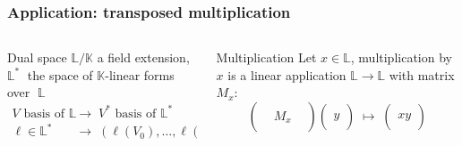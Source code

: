 \documentclass[10pt]{beamer}
\newcommand{\cat}[1]{\mathscr{#1}}
\renewcommand{\L}{\cat{L}}
\newcommand{\K}{\mathbb{K}}
\renewcommand{\L}{\mathbb{L}}
\begin{document}
\begin{frame}
  \frametitle{Application: transposed multiplication}

  \vspace{-3mm}

  \begin{columns}
    \begin{column}{0.45\textwidth}
      \begin{block}{Dual space}
        $\L/\K$ a field extension, $\L^\ast\;$ the space of $\K$-linear forms over
        $\;\L$
        \begin{align*}
          V \text{ basis of } \L &\;\rightarrow\; V^\ast
          \text{ basis of } \L^\ast\\
          \ell\in\L^\ast &\;\rightarrow\;
          \left(\ell(V_0),\ldots,\ell(V_n)\right)
        \end{align*}
      \end{block}
    \end{column}
    \begin{column}{0.5\textwidth}
      \begin{block}{Multiplication}
        Let $x\in\L$, multiplication by $x$ is a linear application
        $\L\rightarrow\L$ with matrix $M_x$:
        \begin{equation*}
          \begin{pmatrix}\\&M_x&\\&\end{pmatrix} 
          \begin{pmatrix}\\y\\{}\end{pmatrix} \;\mapsto\;
          \begin{pmatrix}\\xy\\{}\end{pmatrix}
        \end{equation*}
      \end{block}
    \end{column}
  \end{columns}


\end{frame}
\end{document}
